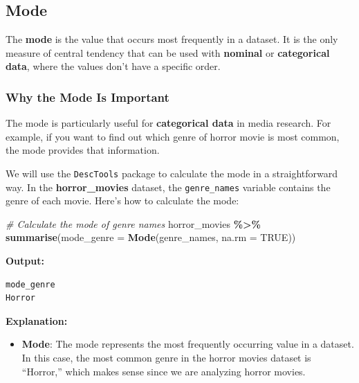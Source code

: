 \documentclass[
]{book}
\newenvironment{Shaded}{\begin{snugshade}}{\end{snugshade}}
\newcommand{\AttributeTok}[1]{\textcolor[rgb]{0.13,0.29,0.53}{#1}}
\newcommand{\CommentTok}[1]{\textcolor[rgb]{0.56,0.35,0.01}{\textit{#1}}}
\newcommand{\ConstantTok}[1]{\textcolor[rgb]{0.56,0.35,0.01}{#1}}
\newcommand{\FunctionTok}[1]{\textcolor[rgb]{0.13,0.29,0.53}{\textbf{#1}}}
\newcommand{\NormalTok}[1]{#1}
\newcommand{\SpecialCharTok}[1]{\textcolor[rgb]{0.81,0.36,0.00}{\textbf{#1}}}
\providecommand{\tightlist}{%
  \setlength{\itemsep}{0pt}\setlength{\parskip}{0pt}}
\begin{document}
\subsection*{Mode}\label{mode}

The \textbf{mode} is the value that occurs most frequently in a dataset. It is the only measure of central tendency that can be used with \textbf{nominal} or \textbf{categorical data}, where the values don't have a specific order.

\subsubsection*{Why the Mode Is Important}\label{why-the-mode-is-important}

The mode is particularly useful for \textbf{categorical data} in media research. For example, if you want to find out which genre of horror movie is most common, the mode provides that information.

We will use the \texttt{DescTools} package to calculate the mode in a straightforward way. In the \textbf{horror\_movies} dataset, the \texttt{genre\_names} variable contains the genre of each movie. Here's how to calculate the mode:

\begin{Shaded}
\begin{Highlighting}[]
\CommentTok{\# Calculate the mode of genre names}
\NormalTok{horror\_movies }\SpecialCharTok{\%\textgreater{}\%}
  \FunctionTok{summarise}\NormalTok{(}\AttributeTok{mode\_genre =} \FunctionTok{Mode}\NormalTok{(genre\_names, }\AttributeTok{na.rm =} \ConstantTok{TRUE}\NormalTok{))}
\end{Highlighting}
\end{Shaded}

\textbf{Output:}

\begin{verbatim}
mode_genre
Horror
\end{verbatim}

\textbf{Explanation:}

\begin{itemize}
\tightlist
\item
  \textbf{Mode}: The mode represents the most frequently occurring value in a dataset. In this case, the most common genre in the horror movies dataset is ``Horror,'' which makes sense since we are analyzing horror movies.
\end{itemize}
\end{document}
